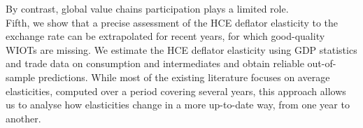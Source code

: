 \documentclass[11pt,a4paper]{paper} %
\begin{document}
By contrast, global value chains participation plays a limited role. \\
Fifth, we show that a precise assessment of the HCE deflator elasticity to the exchange rate can be extrapolated for recent years, for which good-quality WIOTs are missing. 
We estimate the HCE deflator elasticity using GDP statistics and trade data on consumption and intermediates and obtain reliable out-of-sample predictions.
While most of the existing literature focuses on average elasticities, computed over a period covering several years, this approach allows us to analyse how elasticities change in a more up-to-date way, from one year to another. 




\newpage
%
%
%


\end{document}
